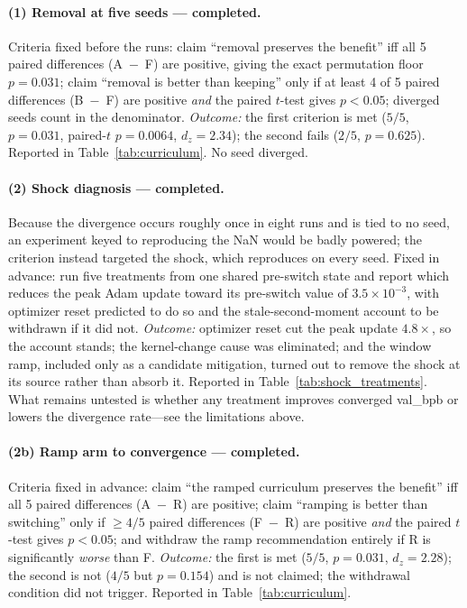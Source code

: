\documentclass[11pt,a4paper]{article}
\begin{document}
\paragraph{(1) Removal at five seeds --- \textnormal{completed}.} Criteria fixed before the runs: claim ``removal preserves the benefit'' iff all 5 paired differences (A~$-$~F) are positive, giving the exact permutation floor $p = 0.031$; claim ``removal is better than keeping'' only if at least 4 of 5 paired differences (B~$-$~F) are positive \emph{and} the paired $t$-test gives $p < 0.05$; diverged seeds count in the denominator. \emph{Outcome:} the first criterion is met ($5/5$, $p=0.031$, paired-$t$ $p=0.0064$, $d_z=2.34$); the second fails ($2/5$, $p=0.625$). Reported in Table~\ref{tab:curriculum}. No seed diverged.

\paragraph{(2) Shock diagnosis --- \textnormal{completed}.} Because the divergence occurs roughly once in eight runs and is tied to no seed, an experiment keyed to reproducing the NaN would be badly powered; the criterion instead targeted the shock, which reproduces on every seed. Fixed in advance: run five treatments from one shared pre-switch state and report which reduces the peak Adam update toward its pre-switch value of $3.5\times10^{-3}$, with optimizer reset predicted to do so and the stale-second-moment account to be withdrawn if it did not. \emph{Outcome:} optimizer reset cut the peak update $4.8\times$, so the account stands; the kernel-change cause was eliminated; and the window ramp, included only as a candidate mitigation, turned out to remove the shock at its source rather than absorb it. Reported in Table~\ref{tab:shock_treatments}. What remains untested is whether any treatment improves converged val\_bpb or lowers the divergence rate---see the limitations above.

\paragraph{(2b) Ramp arm to convergence --- \textnormal{completed}.} Criteria fixed in advance: claim ``the ramped curriculum preserves the benefit'' iff all 5 paired differences (A~$-$~R) are positive; claim ``ramping is better than switching'' only if $\geq4/5$ paired differences (F~$-$~R) are positive \emph{and} the paired $t$-test gives $p<0.05$; and withdraw the ramp recommendation entirely if R is significantly \emph{worse} than F. \emph{Outcome:} the first is met ($5/5$, $p=0.031$, $d_z=2.28$); the second is not ($4/5$ but $p=0.154$) and is not claimed; the withdrawal condition did not trigger. Reported in Table~\ref{tab:curriculum}.
\end{document}
